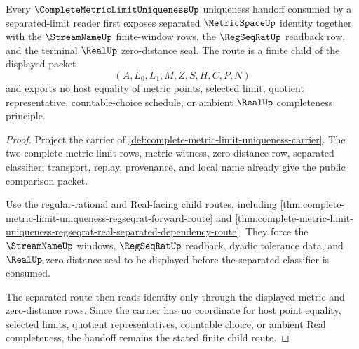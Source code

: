 \begin{theorem}
\label{thm:complete-metric-limit-uniqueness-orphan-regseqrat-route}
Every $\CompleteMetricLimitUniquenessUp$ uniqueness handoff consumed by a separated-limit reader first exposes separated $\MetricSpaceUp$ identity together with the $\StreamNameUp$ finite-window rows, the $\RegSeqRatUp$ readback row, and the terminal $\RealUp$ zero-distance seal. The route is a finite child of the displayed packet
$$
(A,L_{0},L_{1},M,Z,S,H,C,P,N)
$$
and exports no host equality of metric points, selected limit, quotient representative, countable-choice schedule, or ambient $\RealUp$ completeness principle.
\end{theorem}
\begin{proof}
Project the carrier of \autoref{def:complete-metric-limit-uniqueness-carrier}. The two complete-metric limit rows, metric witness, zero-distance row, separated classifier, transport, replay, provenance, and local name already give the public comparison packet.

Use the regular-rational and Real-facing child routes, including \autoref{thm:complete-metric-limit-uniqueness-regseqrat-forward-route} and \autoref{thm:complete-metric-limit-uniqueness-regseqrat-real-separated-dependency-route}. They force the $\StreamNameUp$ windows, $\RegSeqRatUp$ readback, dyadic tolerance data, and $\RealUp$ zero-distance seal to be displayed before the separated classifier is consumed.

The separated route then reads identity only through the displayed metric and zero-distance rows. Since the carrier has no coordinate for host point equality, selected limits, quotient representatives, countable choice, or ambient Real completeness, the handoff remains the stated finite child route.
\end{proof}
